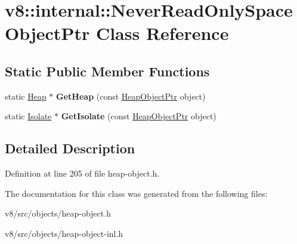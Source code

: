 \hypertarget{classv8_1_1internal_1_1NeverReadOnlySpaceObjectPtr}{}\section{v8\+:\+:internal\+:\+:Never\+Read\+Only\+Space\+Object\+Ptr Class Reference}
\label{classv8_1_1internal_1_1NeverReadOnlySpaceObjectPtr}
\subsection*{Static Public Member Functions}
\begin{DoxyCompactItemize}
\item 
\mbox{\label{classv8_1_1internal_1_1NeverReadOnlySpaceObjectPtr_aac3792aeef7f9b24c65c492822e9da79}} 
static \mbox{\hyperlink{classv8_1_1internal_1_1Heap}{Heap}} $\ast$ {\bfseries Get\+Heap} (const \mbox{\hyperlink{classv8_1_1internal_1_1HeapObjectPtr}{Heap\+Object\+Ptr}} object)
\item 
\mbox{\label{classv8_1_1internal_1_1NeverReadOnlySpaceObjectPtr_a7ce643ddd12e743cf76cd528d910c63a}} 
static \mbox{\hyperlink{classv8_1_1internal_1_1Isolate}{Isolate}} $\ast$ {\bfseries Get\+Isolate} (const \mbox{\hyperlink{classv8_1_1internal_1_1HeapObjectPtr}{Heap\+Object\+Ptr}} object)
\end{DoxyCompactItemize}


\subsection{Detailed Description}


Definition at line 205 of file heap-\/object.\+h.



The documentation for this class was generated from the following files\+:\begin{DoxyCompactItemize}
\item 
v8/src/objects/heap-\/object.\+h\item 
v8/src/objects/heap-\/object-\/inl.\+h\end{DoxyCompactItemize}
